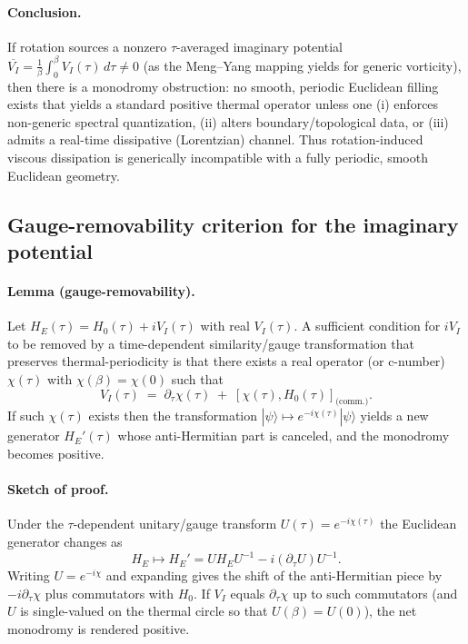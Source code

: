 \documentclass[11pt]{article}
\begin{document}
\paragraph{Conclusion.}
If rotation sources a nonzero \(\tau\)-averaged imaginary potential \(\overline{V_I}\!=\!\tfrac{1}{\beta}\int_0^\beta V_I(\tau)\,d\tau\neq0\) (as the Meng--Yang mapping yields for generic vorticity), then there is a monodromy obstruction: no smooth, periodic Euclidean filling exists that yields a standard positive thermal operator unless one (i) enforces non-generic spectral quantization, (ii) alters boundary/topological data, or (iii) admits a real-time dissipative (Lorentzian) channel. Thus rotation-induced viscous dissipation is generically incompatible with a fully periodic, smooth Euclidean geometry.


\subsection*{Gauge-removability criterion for the imaginary potential}

\paragraph{Lemma (gauge-removability).}
Let \(H_E(\tau)=H_0(\tau)+iV_I(\tau)\) with real \(V_I(\tau)\). A sufficient condition for \(iV_I\) to be removed by a time-dependent similarity/gauge transformation that preserves thermal-periodicity is that there exists a real operator (or c-number) \(\chi(\tau)\) with \(\chi(\beta)=\chi(0)\) such that
\[
V_I(\tau) \;=\; \partial_\tau\chi(\tau) \;+\; [\chi(\tau),H_0(\tau)]_{\text{(comm.)}}.
\]
If such \(\chi(\tau)\) exists then the transformation \(|\psi\rangle\mapsto e^{-i\chi(\tau)}|\psi\rangle\) yields a new generator \(H_E'(\tau)\) whose anti-Hermitian part is canceled, and the monodromy becomes positive.

\paragraph{Sketch of proof.}
Under the \(\tau\)-dependent unitary/gauge transform \(U(\tau)=e^{-i\chi(\tau)}\) the Euclidean generator changes as
\[
H_E \mapsto H_E' = U H_E U^{-1} - i(\partial_\tau U)U^{-1} .
\]
Writing \(U=e^{-i\chi}\) and expanding gives the shift of the anti-Hermitian piece by \(-i\partial_\tau\chi\) plus commutators with \(H_0\). If \(V_I\) equals \(\partial_\tau\chi\) up to such commutators (and \(U\) is single-valued on the thermal circle so that \(U(\beta)=U(0)\)), the net monodromy is rendered positive.
\end{document}

